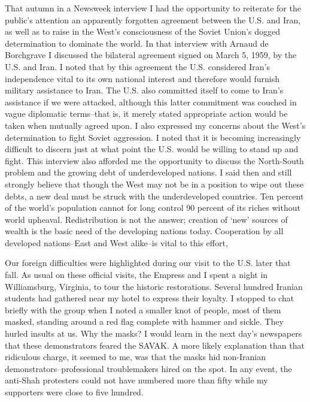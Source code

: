That autumn in a Newsweek interview I had the opportunity to reiterate for the public’s attention an apparently forgotten agreement between the U.S. and Iran, as well as to raise in the West's consciousness of the Soviet Union's dogged determination to dominate the world. In that interview with Arnaud de Borchgrave I discussed the bilateral agreement signed on March 5, 1959, by the U.S. and Iran. I noted that by this agreement the U.S. considered Iran's independence vital to its own national interest and therefore would furnish military assistance to Iran. The U.S. also committed itself to come to Iran's assistance if we were attacked, although this latter commitment was couched in vague diplomatic terms--that is, it merely stated appropriate action would be taken when mutually agreed upon. I also expressed my concerns about the West's determination to fight Soviet aggression. I noted that it is becoming increasingly difficult to discern just at what point the U.S. would be willing to stand up and fight. This interview also afforded me the opportunity to discuss the North-South problem and the growing debt of underdeveloped nations. I said then and still strongly believe that though the West may not be in a position to wipe out these debts, a new deal must be struck with the underdeveloped countries. Ten percent of the world’s population cannot for long control 90 percent of its riches without world upheaval. Redistribution is not the answer; creation of ‘new’ sources of wealth is the basic need of the developing nations today. Cooperation by all developed nations--East and West alike--is vital to this effort, 

Our foreign difficulties were highlighted during our visit to the U.S. later that fall. As usual on these official visits, the Empress and I spent a night in Williamsburg, Virginia, to tour the historic restorations. Several hundred Iranian students had gathered near my hotel to express their loyalty. I stopped to chat briefly with the group when I noted a smaller knot of people, most of them masked, standing around a red flag complete with hammer and sickle. They hurled insults at us. Why the masks? I would learn in the next day's newspapers that these demonstrators feared the SAVAK. A more likely explanation than that ridiculous charge, it seemed to me, was that the masks hid non-Iranian demonstrators--professional troublemakers hired on the spot. In any event, the anti-Shah protesters could not have numbered more than fifty while my supporters were close to five hundred. 

